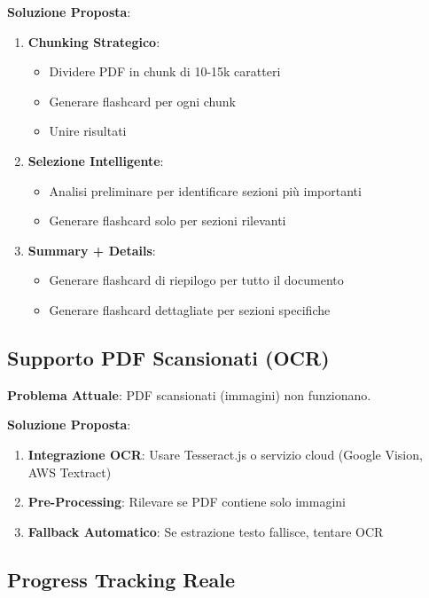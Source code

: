 \documentclass[11pt,a4paper]{article}
\begin{document}
\textbf{Soluzione Proposta}:
\begin{enumerate}
    \item \textbf{Chunking Strategico}: 
        \begin{itemize}
            \item Dividere PDF in chunk di 10-15k caratteri
            \item Generare flashcard per ogni chunk
            \item Unire risultati
        \end{itemize}
    \item \textbf{Selezione Intelligente}:
        \begin{itemize}
            \item Analisi preliminare per identificare sezioni più importanti
            \item Generare flashcard solo per sezioni rilevanti
        \end{itemize}
    \item \textbf{Summary + Details}:
        \begin{itemize}
            \item Generare flashcard di riepilogo per tutto il documento
            \item Generare flashcard dettagliate per sezioni specifiche
        \end{itemize}
\end{enumerate}

\subsection{Supporto PDF Scansionati (OCR)}

\textbf{Problema Attuale}: PDF scansionati (immagini) non funzionano.

\textbf{Soluzione Proposta}:
\begin{enumerate}
    \item \textbf{Integrazione OCR}: Usare Tesseract.js o servizio cloud (Google Vision, AWS Textract)
    \item \textbf{Pre-Processing}: Rilevare se PDF contiene solo immagini
    \item \textbf{Fallback Automatico}: Se estrazione testo fallisce, tentare OCR
\end{enumerate}

\subsection{Progress Tracking Reale}
\end{document}
